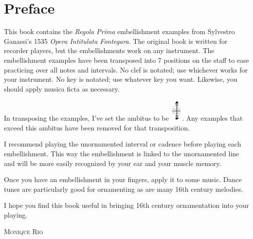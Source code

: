 \documentclass[11pt]{book}
\begin{document}

\setcounter{page}{1}
\section*{Preface}
This book contains the \textit{Regola Prima} embellishment examples from Sylvestro Ganassi's 1535 \textit{Opera Intitulata Fontegara}.	The original book is written for recorder players, but the embellishments work on any instrument. The embellishment examples have been transposed into 7 positions on the staff to ease practicing over all notes and intervals. No clef is notated; use whichever works for your instrument. No key is notated; use whatever key you want. Likewise, you should apply musica ficta as necessary. 

In transposing the examples, I've set the ambitus to be \includegraphics[height=3em]{snippit.png}. Any examples that exceed this ambitus have been removed for that transposition. 


I recommend playing the unornamented interval or cadence before playing each embellishment. This way the embellishment is linked to the unornamented line and will be more easily recognized by your ear and your muscle memory. 

Once you have an embellishment in your fingers, apply it to some music. Dance tunes are particularly good for ornamenting as are many 16th century melodies.

I hope you find this book useful in bringing 16th century ornamentation into your playing. 
\begin{flushright}
\textsc{Monique Rio}
\end{flushright}

\clearpage
{}
\setcounter{page}{1}
\thispagestyle{FooBar}



\thispagestyle{FooBar}

\end{document}
